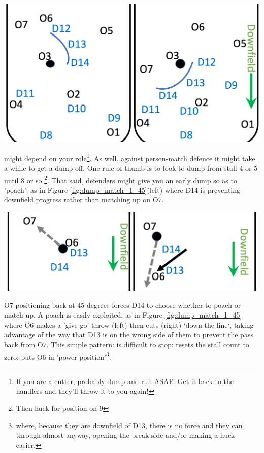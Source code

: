\documentclass{tufte-handout}
\begin{document}
\begin{marginfigure}%
  \includegraphics[width=\linewidth]{dump_zone2}
 \caption{3-3-1, with O3 before (left) and after (right) the cup catches up}
 \label{fig:dump_zone2}
 \end{marginfigure}

might depend on your role\footnote{If you are a cutter, 
probably dump 
and run ASAP.   
Get it back to the handlers 
and they'll throw it to you again!}. 
As well, against person-match defence it 
might take a while to get a dump off.  
One rule of thumb is to look to dump from stall 4 or 5 until 8 or so
\footnote{Then huck for position on 9}. 
That said, defenders might give you an early dump 
so as to 'poach',
as in Figure \ref{fig:dump_match_1_45}(left) where 
D14 is preventing downfield progress rather than matching 
up on O7. 

\begin{marginfigure}%
  \includegraphics[width=\linewidth]{dump_match_1_45}
 \caption{Person-match: open-side poach countered by 45 degree dump}
 \label{fig:dump_match_1_45}
 \end{marginfigure}
 
O7 positioning back at 45 degrees forces D14 to choose 
whether to poach or match up. 
A poach is easily exploited, 
as in Figure \ref{fig:dump_match_1_45}
where O6 makes a 'give-go' throw (left) then cuts (right) `down the line`, 
taking advantage of the way that D13 is on the wrong side of them 
to prevent the pass back from O7. 
This simple pattern: 
is difficult to stop; 
resets the stall count to zero;
puts O6 in 'power position'\footnote{where, because they are downfield of D13, 
there is no force and they can through 
almost anyway, opening the break side 
and/or making a huck easier.}. 
\end{document}
